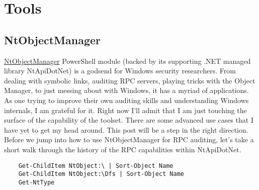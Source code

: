 \section{Tools}

\subsection{NtObjectManager}

\href{https://github.com/googleprojectzero/sandbox-attacksurface-analysis-tools}{NtObjectManager} PowerShell module (backed by its supporting .NET managed library NtApiDotNet) is a godsend for Windows security researchers. From dealing with symbolic links, auditing RPC servers, playing tricks with the Object Manager, to just messing about with Windows, it has a myriad of applications. As one trying to improve their own auditing skills and understanding Windows internals, I am grateful for it. Right now I’ll admit that I am just touching the surface of the capability of the toolset. There are some advanced use cases that I have yet to get my head around. This post will be a step in the right direction. Before we jump into how to use NtObjectManager for RPC auditing, let’s take a short walk through the history of the RPC capabilities within NtApiDotNet.

\begin{verbatim}
    Get-ChildItem NtObject:\ | Sort-Object Name
    Get-ChildItem NtObject:\Dfs | Sort-Object Name
    Get-NtType

\end{verbatim}
